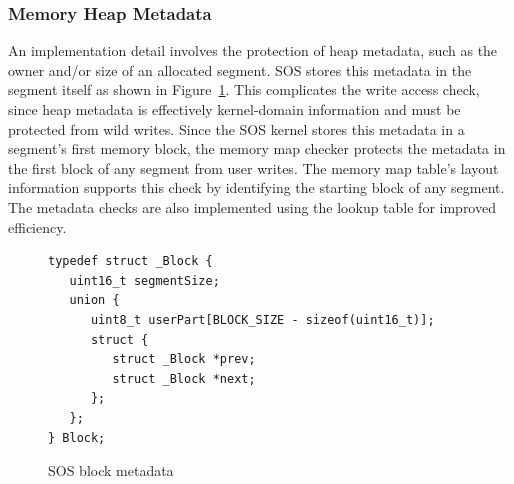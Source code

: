 \subsubsection{Memory Heap Metadata}
%
%
An implementation detail involves the protection of heap metadata, such as
the owner and/or size of an allocated segment.
%
SOS stores this metadata in the segment itself as shown in
Figure~\ref{fig:sos_free_list}.
%
This complicates the write access check, since heap metadata is
effectively kernel-domain information and must be protected from wild
writes.
%
%
%
%
%
Since the SOS kernel stores this metadata in a segment's first
memory block, %
%
%
%
%
the memory map checker protects the metadata in
the first block of any segment from user writes.
%
The memory map table's layout information supports this check by
identifying the starting block of any segment.
%
The metadata checks are also implemented using the lookup table for
improved efficiency.
%
\begin{figure} [h]
  \centering
    {\small
\begin{verbatim}
typedef struct _Block {
   uint16_t segmentSize;
   union {
      uint8_t userPart[BLOCK_SIZE - sizeof(uint16_t)];
      struct {
         struct _Block *prev;
         struct _Block *next;
      };
   };
} Block;
\end{verbatim} }
\caption{SOS block metadata}
\label{fig:sos_free_list}
\end{figure}
%
%
%
%
%
